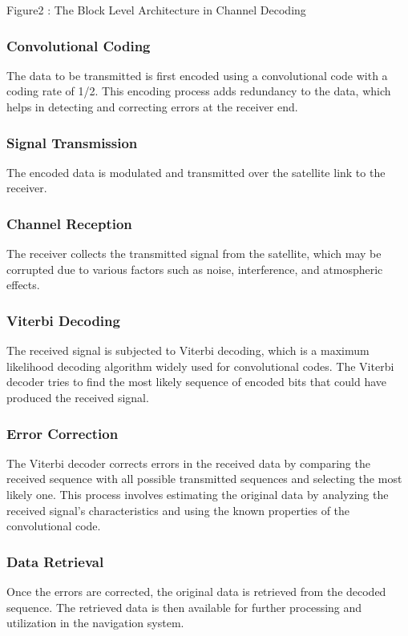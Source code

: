\documentclass[10pt, onecolumn]{article}
\begin{document}
\begin{center}
Figure2 : The Block Level Architecture in Channel Decoding
\end{center}

\subsubsection{Convolutional Coding}
The data to be transmitted is first encoded using a convolutional code with a coding rate of 1/2. This encoding process adds redundancy to the data, which helps in detecting and correcting errors at the receiver end.
\subsubsection{Signal Transmission}
The encoded data is modulated and transmitted over the satellite link to the receiver.
\subsubsection{Channel Reception}
The receiver collects the transmitted signal from the satellite, which may be corrupted due to various factors such as noise, interference, and atmospheric effects.
\subsubsection{Viterbi Decoding}
The received signal is subjected to Viterbi decoding, which is a maximum likelihood decoding algorithm widely used for convolutional codes. The Viterbi decoder tries to find the most likely sequence of encoded bits that could have produced the received signal.
\subsubsection{Error Correction}
The Viterbi decoder corrects errors in the received data by comparing the received sequence with all possible transmitted sequences and selecting the most likely one. This process involves estimating the original data by analyzing the received signal's characteristics and using the known properties of the convolutional code.
\subsubsection{Data Retrieval}
Once the errors are corrected, the original data is retrieved from the decoded sequence. The retrieved data is then available for further processing and utilization in the navigation system.
\end{document}

